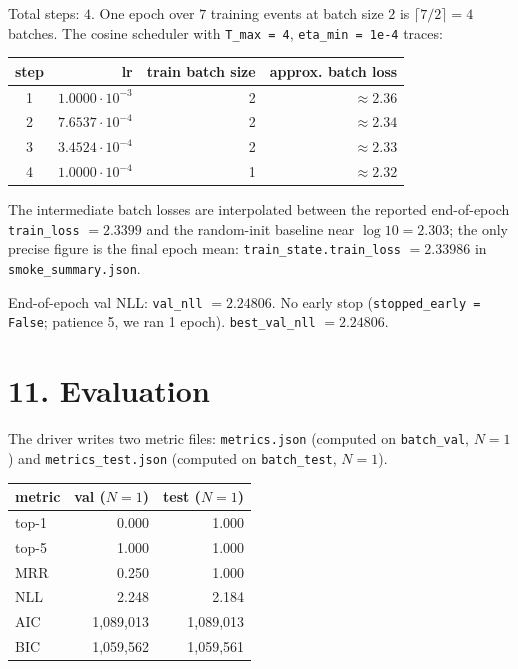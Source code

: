 \documentclass[11pt,a4paper]{article}
\begin{document}
Total steps: $4$. One epoch over $7$ training events at batch size
$2$ is $\lceil 7/2\rceil = 4$ batches. The cosine scheduler with
\texttt{T\_max = 4}, \texttt{eta\_min = 1e-4} traces:

\begin{center}\small
\begin{tabular}{c r r r}\toprule
step & lr & train batch size & approx. batch loss \\
\midrule
1 & $1.0000 \cdot 10^{-3}$ & 2 & $\approx 2.36$ \\
2 & $7.6537 \cdot 10^{-4}$ & 2 & $\approx 2.34$ \\
3 & $3.4524 \cdot 10^{-4}$ & 2 & $\approx 2.33$ \\
4 & $1.0000 \cdot 10^{-4}$ & 1 & $\approx 2.32$ \\
\bottomrule
\end{tabular}\end{center}

The intermediate batch losses are interpolated between the reported
end-of-epoch \texttt{train\_loss} $= 2.3399$ and the random-init
baseline near $\log 10 = 2.303$; the only precise figure is the final
epoch mean: \texttt{train\_state.train\_loss} $= 2.33986$ in
\texttt{smoke\_summary.json}.

End-of-epoch val NLL: \texttt{val\_nll} $= 2.24806$. No early stop
(\texttt{stopped\_early = False}; patience 5, we ran 1 epoch).
\texttt{best\_val\_nll} $= 2.24806$.

\section*{11. Evaluation}

The driver writes two metric files: \texttt{metrics.json} (computed
on \texttt{batch\_val}, $N = 1$) and \texttt{metrics\_test.json}
(computed on \texttt{batch\_test}, $N = 1$).

\begin{center}\small
\begin{tabular}{l r r}\toprule
metric & val ($N = 1$) & test ($N = 1$) \\
\midrule
top-1         & 0.000       & 1.000       \\
top-5         & 1.000       & 1.000       \\
MRR           & 0.250       & 1.000       \\
NLL           & 2.248       & 2.184       \\
AIC           & 1{,}089{,}013 & 1{,}089{,}013 \\
BIC           & 1{,}059{,}562 & 1{,}059{,}561 \\
\bottomrule
\end{tabular}\end{center}
\end{document}
